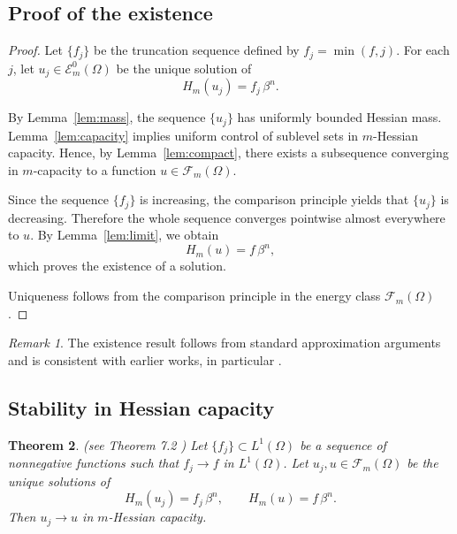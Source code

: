\documentclass[11pt,reqno]{amsart}
\newtheorem{theorem}{Theorem}[section]
\theoremstyle{definition}
\theoremstyle{remark}
\newtheorem{remark}[theorem]{Remark}
\begin{document}
	
	\subsection{Proof of the existence}
	
	\begin{proof}
		Let $\{f_j\}$ be the truncation sequence defined by
		$f_j = \min(f,j)$.
		For each $j$, let $u_j \in \mathcal{E}_m^0(\Omega)$ be the unique solution of
		\[
		H_m(u_j) = f_j \, \beta^n.
		\]
		
		By Lemma~\ref{lem:mass}, the sequence $\{u_j\}$ has uniformly bounded Hessian mass.
		Lemma~\ref{lem:capacity} implies uniform control of sublevel sets in $m$-Hessian capacity.
		Hence, by Lemma~\ref{lem:compact}, there exists a subsequence converging in $m$-capacity to a function
		$u \in \mathcal{F}_m(\Omega)$.
		
		Since the sequence $\{f_j\}$ is increasing, the comparison principle yields that $\{u_j\}$ is decreasing.
		Therefore the whole sequence converges pointwise almost everywhere to $u$.
		By Lemma~\ref{lem:limit}, we obtain
		\[
		H_m(u) = f \, \beta^n,
		\]
		which proves the existence of a solution.
		
		Uniqueness follows from the comparison principle in the energy class $\mathcal{F}_m(\Omega)$.
	\end{proof}
	
	
\begin{remark}
	The existence result follows from standard approximation arguments
	and is consistent with earlier works, in particular \cite{Lu}.
\end{remark}
\subsection{Stability in Hessian capacity}



\begin{theorem}\label{thm:stability}(see Theorem 7.2 \cite{V T Nguyen})
	Let $\{f_j\} \subset L^1(\Omega)$ be a sequence of nonnegative functions such that
	$f_j \to f$ in $L^1(\Omega)$.
	Let $u_j, u \in \mathcal{F}_m(\Omega)$ be the unique solutions of
	\[
	H_m(u_j) = f_j \, \beta^n,
	\qquad
	H_m(u) = f \, \beta^n.
	\]
	Then $u_j \to u$ in $m$-Hessian capacity.
\end{theorem}
\end{document}
